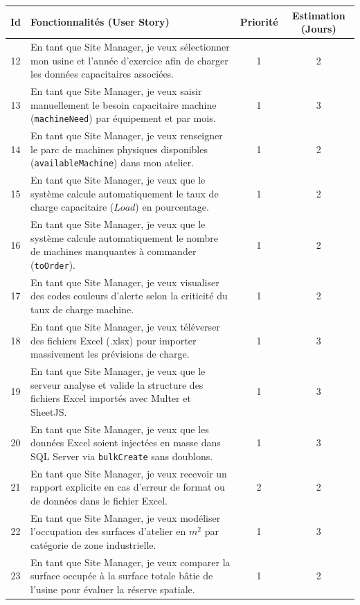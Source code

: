 \begin{table}[H]
\centering
\begin{tabular}{|c|p{9.2cm}|c|c|}
\hline
\textbf{Id} & \textbf{Fonctionnalités (User Story)} & \textbf{Priorité} & \textbf{Estimation (Jours)} \\ \hline
12 & En tant que Site Manager, je veux sélectionner mon usine et l'année d'exercice afin de charger les données capacitaires associées. & 1 & 2 \\ \hline
13 & En tant que Site Manager, je veux saisir manuellement le besoin capacitaire machine (\texttt{machineNeed}) par équipement et par mois. & 1 & 3 \\ \hline
14 & En tant que Site Manager, je veux renseigner le parc de machines physiques disponibles (\texttt{availableMachine}) dans mon atelier. & 1 & 2 \\ \hline
15 & En tant que Site Manager, je veux que le système calcule automatiquement le taux de charge capacitaire ($Load$) en pourcentage. & 1 & 2 \\ \hline
16 & En tant que Site Manager, je veux que le système calcule automatiquement le nombre de machines manquantes à commander (\texttt{toOrder}). & 1 & 2 \\ \hline
17 & En tant que Site Manager, je veux visualiser des codes couleurs d'alerte selon la criticité du taux de charge machine. & 1 & 2 \\ \hline
18 & En tant que Site Manager, je veux téléverser des fichiers Excel (.xlsx) pour importer massivement les prévisions de charge. & 1 & 3 \\ \hline
19 & En tant que Site Manager, je veux que le serveur analyse et valide la structure des fichiers Excel importés avec Multer et SheetJS. & 1 & 3 \\ \hline
20 & En tant que Site Manager, je veux que les données Excel soient injectées en masse dans SQL Server via \texttt{bulkCreate} sans doublons. & 1 & 3 \\ \hline
21 & En tant que Site Manager, je veux recevoir un rapport explicite en cas d'erreur de format ou de données dans le fichier Excel. & 2 & 2 \\ \hline
22 & En tant que Site Manager, je veux modéliser l'occupation des surfaces d'atelier en $m^2$ par catégorie de zone industrielle. & 1 & 3 \\ \hline
23 & En tant que Site Manager, je veux comparer la surface occupée à la surface totale bâtie de l'usine pour évaluer la réserve spatiale. & 1 & 2 \\ \hline

\end{tabular}
\end{table}

